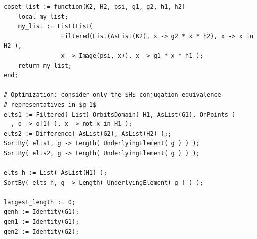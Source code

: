 \documentclass[12pt,leqno]{amsart}
\newcommand{\2}{L^2_{\rm per}(0, T)}
\numberwithin{equation}{section}
\numberwithin{figure}{section}
\begin{document}
\begin{verbatim}
coset_list := function(K2, H2, psi, g1, g2, h1, h2)
    local my_list;
    my_list := List(List(
                Filtered(List(AsList(K2), x -> g2 * x * h2), x -> x in H2 ),
                x -> Image(psi, x)), x -> g1 * x * h1 );
    return my_list;
end;

# Optimization: consider only the $H$-conjugation equivalence
# representatives in $g_1$
elts1 := Filtered( List( OrbitsDomain( H1, AsList(G1), OnPoints )
  , o -> o[1] ), x -> not x in H1 );
elts2 := Difference( AsList(G2), AsList(H2) );;
SortBy( elts1, g -> Length( UnderlyingElement( g ) ) ); 
SortBy( elts2, g -> Length( UnderlyingElement( g ) ) );

elts_h := List( AsList(H1) );
SortBy( elts_h, g -> Length( UnderlyingElement( g ) ) ); 

largest_length := 0;
genh := Identity(G1);
gen1 := Identity(G1);
gen2 := Identity(G2);


\end{verbatim}
\end{document}
